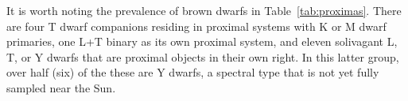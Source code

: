 \documentclass[twocolumn,tighten,twocolappendix]{aastex631}
\begin{document}
It is worth noting the prevalence of brown dwarfs in Table~\ref{tab:proximas}. There are four T dwarf companions residing in proximal systems with K or M dwarf primaries, one L+T binary as its own proximal system, and eleven solivagant L, T, or Y dwarfs that are proximal objects in their own right. In this latter group, over half (six) of the these are Y dwarfs, a spectral type that is not yet fully sampled near the Sun.
\end{document}
